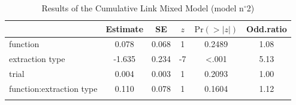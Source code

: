 \begin{table}
\begin{tabular}{l S[table-format=-1.3] S[table-format=1.3] S[table-format=-1] S[table-format=<1.4] S[table-format=1.2]}
  \lsptoprule
 & {Estimate} & {SE} & {$z$} & {$\text{Pr}(>|z|)$} & {Odd.ratio} \\ 
  \midrule
  function & 0.078 & 0.068 & 1 & 0.2489 & 1.08 \\ 
  extraction type & -1.635 & 0.234 & -7 & <.001 & 5.13 \\ 
  trial & 0.004 & 0.003 & 1 & 0.2093 & 1.00 \\ 
  function:extraction type & 0.110 & 0.078 & 1 & 0.1604 & 1.12 \\ 
   \lspbottomrule
\end{tabular}
\caption{Results of the Cumulative Link Mixed Model (model n$^{\circ}$2)}
\label{tab:exp05-m2}
\end{table}

